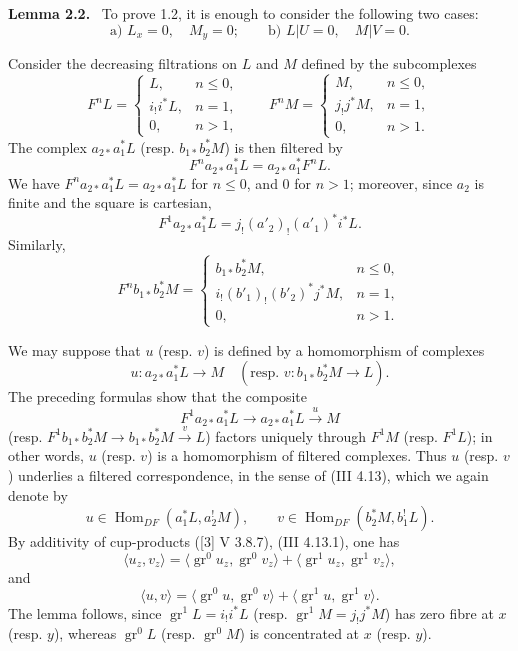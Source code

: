 \documentclass[11pt]{article}
\newenvironment{statement}[1]{\par\medskip\noindent\textbf{#1.}\ }{\par\medskip}
\DeclareMathOperator{\Hom}{Hom}
\providecommand{\Hom}{\operatorname{Hom}}
\providecommand{\Hom}{\operatorname{Hom}}
\begin{document}
\begin{statement}{Lemma 2.2}
To prove 1.2, it is enough to consider the following two cases:
\[
\text{a) } L_x=0,\quad M_y=0;\qquad
\text{b) } L|U=0,\quad M|V=0 .
\]
\end{statement}

Consider the decreasing filtrations on $L$ and $M$ defined by the subcomplexes
\[
F^nL=
\begin{cases}
L,& n\le 0,\\
i_!i^*L,& n=1,\\
0,& n>1,
\end{cases}
\qquad
F^nM=
\begin{cases}
M,& n\le 0,\\
j_!j^*M,& n=1,\\
0,& n>1.
\end{cases}
\]
The complex $a_{2*}a_1^*L$ (resp. $b_{1*}b_2^*M$) is then filtered by
\[
F^n a_{2*}a_1^*L=a_{2*}a_1^*F^nL.
\]
We have $F^n a_{2*}a_1^*L=a_{2*}a_1^*L$ for $n\le0$, and $0$ for $n>1$; moreover, since $a_2$ is finite and the square is cartesian,
\[
F^1a_{2*}a_1^*L=j_!(a'_2)_!(a'_1)^*i^*L.
\]
Similarly,
\[
F^n b_{1*}b_2^*M=
\begin{cases}
b_{1*}b_2^*M,& n\le 0,\\
i_!(b'_1)_!(b'_2)^*j^*M,& n=1,\\
0,& n>1.
\end{cases}
\]

We may suppose that $u$ (resp. $v$) is defined by a homomorphism of complexes
\[
u:a_{2*}a_1^*L\longrightarrow M
\quad
(\text{resp. }v:b_{1*}b_2^*M\longrightarrow L).
\]
The preceding formulas show that the composite
\[
F^1a_{2*}a_1^*L\longrightarrow a_{2*}a_1^*L\xrightarrow{u}M
\]
(resp. $F^1b_{1*}b_2^*M\to b_{1*}b_2^*M\xrightarrow{v}L$) factors uniquely through $F^1M$ (resp. $F^1L$); in other words, $u$ (resp. $v$) is a homomorphism of filtered complexes. Thus $u$ (resp. $v$) underlies a filtered correspondence, in the sense of (III 4.13), which we again denote by
\[
u\in\Hom_{DF}(a_1^*L,a_2^!M),\qquad
v\in\Hom_{DF}(b_2^*M,b_1^!L).
\]
By additivity of cup-products ([3] V 3.8.7), (III 4.13.1), one has
\[
\langle u_z,v_z\rangle
 =\langle \operatorname{gr}^0u_z,\operatorname{gr}^0v_z\rangle
 +\langle \operatorname{gr}^1u_z,\operatorname{gr}^1v_z\rangle,
\]
and
\[
\langle u,v\rangle
 =\langle \operatorname{gr}^0u,\operatorname{gr}^0v\rangle
 +\langle \operatorname{gr}^1u,\operatorname{gr}^1v\rangle.
\]
The lemma follows, since $\operatorname{gr}^1L=i_!i^*L$ (resp. $\operatorname{gr}^1M=j_!j^*M$) has zero fibre at $x$ (resp. $y$), whereas $\operatorname{gr}^0L$ (resp. $\operatorname{gr}^0M$) is concentrated at $x$ (resp. $y$).
\end{document}
